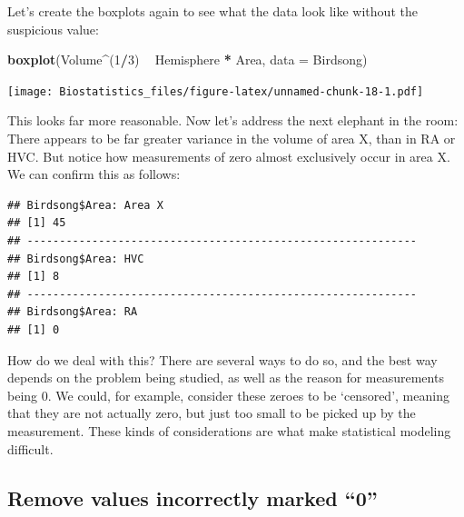 \documentclass[
]{book}
\newenvironment{Shaded}{\begin{snugshade}}{\end{snugshade}}
\newcommand{\ControlFlowTok}[1]{\textcolor[rgb]{0.13,0.29,0.53}{\textbf{#1}}}
\newcommand{\DataTypeTok}[1]{\textcolor[rgb]{0.13,0.29,0.53}{#1}}
\newcommand{\DecValTok}[1]{\textcolor[rgb]{0.00,0.00,0.81}{#1}}
\newcommand{\KeywordTok}[1]{\textcolor[rgb]{0.13,0.29,0.53}{\textbf{#1}}}
\newcommand{\NormalTok}[1]{#1}
\newcommand{\OperatorTok}[1]{\textcolor[rgb]{0.81,0.36,0.00}{\textbf{#1}}}
\newcommand{\OtherTok}[1]{\textcolor[rgb]{0.56,0.35,0.01}{#1}}
\newcommand{\StringTok}[1]{\textcolor[rgb]{0.31,0.60,0.02}{#1}}
\begin{document}
Let's create the boxplots again to see what the data look like without the suspicious value:

\begin{Shaded}
\begin{Highlighting}[]
\KeywordTok{boxplot}\NormalTok{(Volume}\OperatorTok{^}\NormalTok{(}\DecValTok{1}\OperatorTok{/}\DecValTok{3}\NormalTok{) }\OperatorTok{~}\StringTok{ }\NormalTok{Hemisphere }\OperatorTok{*}\StringTok{ }\NormalTok{Area, }\DataTypeTok{data =}\NormalTok{ Birdsong)}
\end{Highlighting}
\end{Shaded}

\texttt{[image: Biostatistics\_files/figure-latex/unnamed-chunk-18-1.pdf]}

This looks far more reasonable. Now let's address the next elephant in the room: There appears to be far greater variance in the volume of area X, than in RA or HVC. But notice how measurements of zero almost exclusively occur in area X. We can confirm this as follows:

\begin{Shaded}
\end{Shaded}

\begin{verbatim}
## Birdsong$Area: Area X
## [1] 45
## ------------------------------------------------------------ 
## Birdsong$Area: HVC
## [1] 8
## ------------------------------------------------------------ 
## Birdsong$Area: RA
## [1] 0
\end{verbatim}

How do we deal with this? There are several ways to do so, and the best way depends on the problem being studied, as well as the reason for measurements being \(0\). We could, for example, consider these zeroes to be `censored', meaning that they are not actually zero, but just too small to be picked up by the measurement. These kinds of considerations are what make statistical modeling difficult.

\hypertarget{remove-values-incorrectly-marked-0}{%
\subsection{Remove values incorrectly marked ``0''}\label{remove-values-incorrectly-marked-0}}
\end{document}
